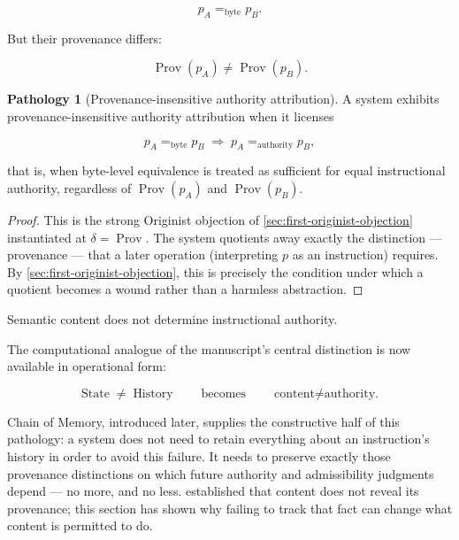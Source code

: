 \documentclass[
  11pt,
  a4paper,
  DIV=12,
  BCOR=0mm,
  parskip=half-
]{scrartcl}
\newcommand{\eqbyte}{=_{\mathrm{byte}}}
\newcommand{\Prov}{\operatorname{Prov}}
\newcommand{\State}{\operatorname{State}}
\newcommand{\History}{\operatorname{History}}
\theoremstyle{definition}
\newtheorem{pathology}[definition]{Pathology}
\theoremstyle{plain}
\theoremstyle{remark}
\begin{document}
\[
  p_A\eqbyte p_B.
\]

But their provenance differs:

\[
  \Prov(p_A)\neq\Prov(p_B).
\]

\begin{pathology}[Provenance-insensitive authority attribution]
\label{path:prompt-injection}
A system exhibits provenance-insensitive authority attribution when it
licenses

\[
  p_A\eqbyte p_B
  \;\Longrightarrow\;
  p_A=_{\mathrm{authority}}p_B,
\]

that is, when byte-level equivalence is treated as sufficient for equal
instructional authority, regardless of \(\Prov(p_A)\) and \(\Prov(p_B)\).
\end{pathology}

\begin{proof}
This is the strong Originist objection of
\cref{sec:first-originist-objection} instantiated at \(\delta=\Prov\). The
system quotients away exactly the distinction — provenance — that a later
operation (interpreting \(p\) as an instruction) requires. By
\cref{sec:first-originist-objection}, this is precisely the condition under
which a quotient becomes a wound rather than a harmless abstraction.
\end{proof}

\begin{held}
\centering
Semantic content does not determine instructional authority.
\end{held}

The computational analogue of the manuscript's central distinction is now
available in operational form:

\[
  \boxed{\State\neq\History}
  \qquad\text{becomes}\qquad
  \boxed{\text{content}\neq\text{authority.}}
\]

Chain of Memory, introduced later, supplies the constructive half of this
pathology: a system does not need to retain everything about an
instruction's history in order to avoid this failure. It needs to preserve
exactly those provenance distinctions on which future authority and
admissibility judgments depend — no more, and no less.
 established that content does not reveal its
provenance; this section has shown why failing to track that fact can
change what content is permitted to do.

\end{document}
